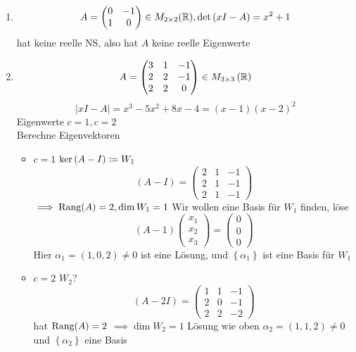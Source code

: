 \begin{subexample}
	\begin{enumerate}[label=(\arabic*)]
		\item 
			\[
				A = \begin{pmatrix} 0 & -1 \\ 1 & 0 \end{pmatrix} \in M_{2 \times 2} (\mathbb{R} ), \det\left( xI - A \right) = x^2 + 1
			\]
			hat keine reelle NS, also hat $ A $ keine reelle Eigenwerte
		\item
			\[
				A = \begin{pmatrix} 3 & 1 & -1 \\ 2 & 2 & -1 \\ 2 & 2 & 0 \end{pmatrix} \in M_{3 \times 3} \left( \mathbb{R}  \right) 
			\]
			\[
				\left| xI - A \right| = x^3 - 5x^2 + 8x - 4 = \left( x - 1 \right) \left( x - 2 \right) ^2
			\]
			Eigenwerte $ c = 1, c = 2 $\\
			Berechne Eigenvektoren
			\begin{itemize}
				\item $ c = 1 $ 
					$ \operatorname{ker} \left( A - I \right) \coloneqq W_1 $ 
					\[
						\left( A - I \right) = \begin{pmatrix} 2 & 1 & -1 \\ 2 & 1 & -1 \\ 2 & 1 & -1 \end{pmatrix} 
					\]
					$ \implies \operatorname{Rang}(A) = 2, \dim W_1 = 1 $
					Wir wollen eine Basis für $ W_1 $ finden, löse
					\[
						(A - 1) \begin{pmatrix} x_1 \\ x_2 \\x_3 \end{pmatrix} = \begin{pmatrix} 0 \\ 0 \\ 0 \end{pmatrix} 
					\]
					Hier $ \alpha_1 = \left( 1, 0, 2 \right) \neq 0 $ ist eine Lösung, und
					$ \left\{ \alpha_1 \right\}  $ ist eine Basis für $ W_1 $ 
				\item $ c = 2 $ $ W_2 $?
					\[
						\left( A - 2I \right) = \begin{pmatrix} 1 & 1 & -1 \\ 2 & 0 & -1 \\ 2 & 2 & -2 \end{pmatrix} 
					\]
					hat $ \operatorname{Rang}(A) = 2 $ $ \implies \dim W_2 = 1 $ 
					Lösung wie oben
					$ \alpha_2 = (1, 1, 2) \neq 0 $ und $ \left\{ \alpha_2 \right\}  $ eine Basis
			\end{itemize}
	\end{enumerate}
\end{subexample}

